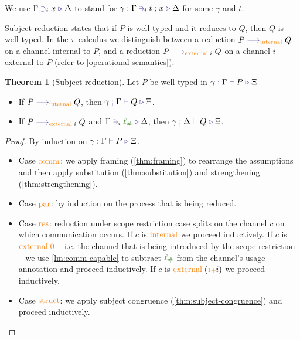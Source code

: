 \documentclass[a4paper,UKenglish,cleveref,autoref,thm-restate,authorcolumns]{lipics-v2019}
\theoremstyle{definition}
\newtheorem{nitheorem}{Theorem}
\newcommand{\picalc}{$\pi$-calculus}
\newcommand{\type}[1]{\textcolor{BlueViolet}{\operatorname{#1}}}
\newcommand{\constr}[1]{\textcolor{BurntOrange}{\operatorname{#1}}}
\newcommand{\func}[1]{\textcolor{OliveGreen}{\operatorname{#1}}}
\newcommand{\suc}{\constr{\scriptstyle 1+}}
\newcommand{\lio}{\func{\ell_{\#}}}
\newcommand{\reduce}[1]{\; \type{\longrightarrow}_{#1} \;}
\newcommand{\types}[4]{#1 \; \type{;} \; #2 \; \type{\vdash} \; #3 \; \type{\triangleright} \; #4}
\newcommand{\contains}[6]{#1 \; \type{;} \; #2 \; \type{\ni}_{#3} \; #4 \; \type{;} \; #5 \; \type{\triangleright} \; #6}
\newcommand{\containsusage}[4]{#1 \; \type{\ni}_{#2} \; #3 \; \type{\triangleright} \; #4}
\begin{document}
\begin{note}
  We use $\containsusage{\Gamma}{i}{x}{\Delta}$ to stand for $\contains{\gamma}{\Gamma}{i}{t}{x}{\Delta}$ for some $\gamma$ and $t$.
\end{note}
Subject reduction states that if $P$ is well typed and it reduces to $Q$, then $Q$ is well typed.
In the \picalc{} we distinguish between a reduction $P \reduce{\constr{internal}} Q$ on a channel internal to $P$, and a reduction $P \reduce{\constr{external} \; i} Q$ on a channel $i$ external to $P$ (refer to \autoref{operational-semantics}).
\begin{nitheorem}[Subject reduction]
  Let $P$ be well typed in $\types{\gamma}{\Gamma}{P}{\Xi}$
  \begin{itemize}
    \item If $P \reduce{\constr{internal}} Q$, then $\types{\gamma}{\Gamma}{Q}{\Xi}$.
    \item If $P \reduce{\constr{external} \; i} Q$ and $\containsusage{\Gamma}{i}{\lio}{\Delta}$, then $\types{\gamma}{\Delta}{Q}{\Xi}$.
  \end{itemize}
\end{nitheorem}

\begin{proof}
  By induction on $\types{\gamma}{\Gamma}{P}{\Xi}$.
  \hfill{}\\
  \begin{itemize}
    \item
    Case $\constr{comm}$: we apply framing (\autoref{thm:framing}) to rearrange the assumptions and then apply substitution (\autoref{thm:substitution}) and strengthening (\autoref{thm:strengthening}).
  
    \item
    Case $\constr{par}$: by induction on the process that is being reduced.

    \item
    Case $\constr{res}$: reduction under scope restriction case splits on the channel $c$ on which communication occurs.
    If $c$ is $\constr{internal}$ we proceed inductively.
    If $c$ is $\constr{external}\; \constr{0}$ -- i.e. the channel that is being introduced by the scope restriction -- we use \autoref{lm:comm-capable} to subtract $\lio$ from the channel's usage annotation and proceed inductively.
    If $c$ is $\constr{external}\; (\suc i)$ we proceed inductively.

    \item
    Case $\constr{struct}$: we apply subject congruence (\autoref{thm:subject-congruence}) and proceed inductively.
  \end{itemize}
\end{proof}
\end{document}
